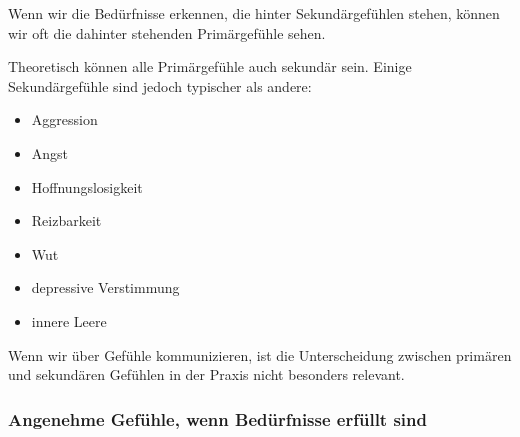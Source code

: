 Wenn wir die Bedürfnisse erkennen, die hinter Sekundärgefühlen stehen, können wir oft die dahinter stehenden Primärgefühle sehen.

Theoretisch können alle Primärgefühle auch sekundär sein. Einige Sekundärgefühle sind jedoch typischer als andere:

\begin{itemize}
 \item Aggression
 \item Angst
 \item Hoffnungslosigkeit
 \item Reizbarkeit
 \item Wut
 \item depressive Verstimmung
 \item innere Leere
\end{itemize}

Wenn wir über Gefühle kommunizieren, ist die Unterscheidung zwischen primären und sekundären Gefühlen in der Praxis nicht besonders relevant.

\subsubsection{Angenehme Gefühle, wenn Bedürfnisse erfüllt sind}
\label{gefuehle-liste}
\label{angenehme-gefuehle}

